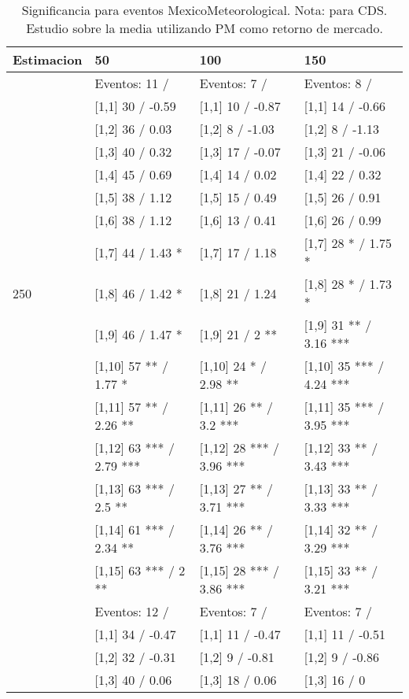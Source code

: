 \begin{table}

\caption{Significancia para eventos MexicoMeteorological. Nota: para CDS. Estudio sobre la media utilizando PM como retorno de mercado.}
\centering
\begin{tabular}[t]{llll}
\toprule
Estimacion & 50 & 100 & 150\\
\midrule
 & Eventos:  11 / & Eventos:  7 / & Eventos:  8 /\\
 & {}[1,1] 30  / -0.59 & {}[1,1] 10  / -0.87 & {}[1,1] 14  / -0.66\\
 & {}[1,2] 36  / 0.03 & {}[1,2] 8  / -1.03 & {}[1,2] 8  / -1.13\\
 & {}[1,3] 40  / 0.32 & {}[1,3] 17  / -0.07 & {}[1,3] 21  / -0.06\\
 & {}[1,4] 45  / 0.69 & {}[1,4] 14  / 0.02 & {}[1,4] 22  / 0.32\\
\addlinespace
 & {}[1,5] 38  / 1.12 & {}[1,5] 15  / 0.49 & {}[1,5] 26  / 0.91\\
 & {}[1,6] 38  / 1.12 & {}[1,6] 13  / 0.41 & {}[1,6] 26  / 0.99\\
 & {}[1,7] 44  / 1.43 * & {}[1,7] 17  / 1.18 & {}[1,7] 28 * / 1.75 *\\
250 & {}[1,8] 46  / 1.42 * & {}[1,8] 21  / 1.24 & {}[1,8] 28 * / 1.73 *\\
 & {}[1,9] 46  / 1.47 * & {}[1,9] 21  / 2 ** & {}[1,9] 31 ** / 3.16 ***\\
\addlinespace
 & {}[1,10] 57 ** / 1.77 * & {}[1,10] 24 * / 2.98 ** & {}[1,10] 35 *** / 4.24 ***\\
 & {}[1,11] 57 ** / 2.26 ** & {}[1,11] 26 ** / 3.2 *** & {}[1,11] 35 *** / 3.95 ***\\
 & {}[1,12] 63 *** / 2.79 *** & {}[1,12] 28 *** / 3.96 *** & {}[1,12] 33 ** / 3.43 ***\\
 & {}[1,13] 63 *** / 2.5 ** & {}[1,13] 27 ** / 3.71 *** & {}[1,13] 33 ** / 3.33 ***\\
 & {}[1,14] 61 *** / 2.34 ** & {}[1,14] 26 ** / 3.76 *** & {}[1,14] 32 ** / 3.29 ***\\
\addlinespace
 & {}[1,15] 63 *** / 2 ** & {}[1,15] 28 *** / 3.86 *** & {}[1,15] 33 ** / 3.21 ***\\
 & Eventos:  12 / & Eventos:  7 / & Eventos:  7 /\\
 & {}[1,1] 34  / -0.47 & {}[1,1] 11  / -0.47 & {}[1,1] 11  / -0.51\\
 & {}[1,2] 32  / -0.31 & {}[1,2] 9  / -0.81 & {}[1,2] 9  / -0.86\\
 & {}[1,3] 40  / 0.06 & {}[1,3] 18  / 0.06 & {}[1,3] 16  / 0\\

\end{tabular}
\end{table}

